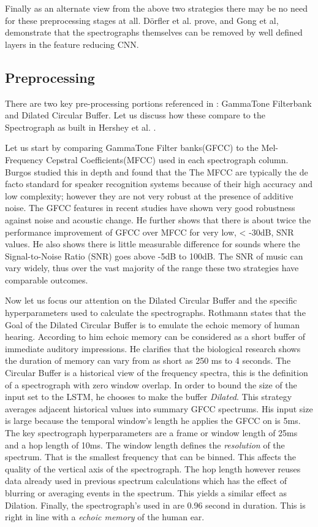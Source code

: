 \documentclass{article}
\begin{document}
Finally as an alternate view from the above two strategies there may be no need for these preprocessing stages at all. Dörfler et al. \cite{dorfler} prove, and Gong et al, \cite{gong} demonstrate that the spectrographs themselves can be removed by well defined layers in the feature reducing CNN.

\subsection{Preprocessing}\label{sec:preprocessing}

There are two key pre-processing portions referenced in \cite{rothmann}: GammaTone Filterbank and Dilated Circular Buffer.  Let us discuss how these compare to the Spectrograph as built in Hershey et al. \cite{hershey}.

Let us start by comparing GammaTone Filter banks(GFCC) to the Mel-Frequency Cepstral Coefficients(MFCC) used in each spectrograph column.  Burgos \cite{burgos} studied this in depth and found that the The MFCC are typically the de facto standard for speaker recognition systems because of their high accuracy and low complexity; however they are not very robust at the presence of additive noise. The GFCC features in recent studies have shown very good robustness against noise and acoustic change.  He further shows that there is about twice the performance improvement of GFCC over MFCC for very low, < -30dB, SNR values. He also shows there is little measurable difference for sounds where the Signal-to-Noise Ratio (SNR) goes above -5dB to 100dB.  The SNR of music can vary widely, thus over the vast majority of the range these two strategies have comparable outcomes.

Now let us focus our attention on the Dilated Circular Buffer and the specific hyperparameters used to calculate the spectrographs.  Rothmann \cite{rothmann} states that the Goal of the Dilated Circular Buffer is to emulate the echoic memory of human hearing.  According to him echoic memory can be considered as a short buffer of immediate auditory impressions. He clarifies that the biological research shows the duration of memory can vary from as short as 250 ms to 4 seconds. The Circular Buffer is a historical view of the frequency spectra, this is the definition of a spectrograph with zero window overlap.
In order to bound the size of the input set to the LSTM, he chooses to make the buffer \textit{Dilated}.  This strategy averages adjacent historical values into summary GFCC spectrums.  His input size is large because the temporal window’s length he applies the GFCC on is 5ms.  The key spectrograph hyperparameters are a frame or window length of 25ms and a hop length of 10ms.  The window length defines the \textit{resolution} of the spectrum. That is the smallest frequency that can be binned.  This affects the quality of the vertical axis of the spectrograph.  The hop length however reuses data already used in previous spectrum calculations which has the effect of blurring or averaging events in the spectrum. This yields a similar effect as Dilation.  Finally, the spectrograph’s used in \cite{rothmann} are 0.96 second in duration.  This is right in line with a \textit{echoic memory} of the human ear.
\end{document}
